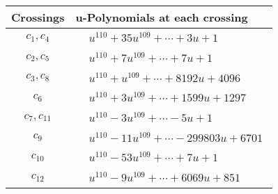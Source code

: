 \documentclass[1p]{elsarticle_modified}
\theoremstyle{definition}
\begin{document}
\begin{tabular}{m{50pt}|m{274pt}}
Crossings & \hspace{64pt}u-Polynomials at each crossing \\
\hline $$\begin{aligned}c_{1},c_{4}\end{aligned}$$&$\begin{aligned}
&u^{110}+35 u^{109}+\cdots+3 u+1
\end{aligned}$\\
\hline $$\begin{aligned}c_{2},c_{5}\end{aligned}$$&$\begin{aligned}
&u^{110}+7 u^{109}+\cdots+7 u+1
\end{aligned}$\\
\hline $$\begin{aligned}c_{3},c_{8}\end{aligned}$$&$\begin{aligned}
&u^{110}+u^{109}+\cdots+8192 u+4096
\end{aligned}$\\
\hline $$\begin{aligned}c_{6}\end{aligned}$$&$\begin{aligned}
&u^{110}+3 u^{109}+\cdots+1599 u+1297
\end{aligned}$\\
\hline $$\begin{aligned}c_{7},c_{11}\end{aligned}$$&$\begin{aligned}
&u^{110}-3 u^{109}+\cdots-5 u+1
\end{aligned}$\\
\hline $$\begin{aligned}c_{9}\end{aligned}$$&$\begin{aligned}
&u^{110}-11 u^{109}+\cdots-299803 u+6701
\end{aligned}$\\
\hline $$\begin{aligned}c_{10}\end{aligned}$$&$\begin{aligned}
&u^{110}-53 u^{109}+\cdots+7 u+1
\end{aligned}$\\
\hline $$\begin{aligned}c_{12}\end{aligned}$$&$\begin{aligned}
&u^{110}-9 u^{109}+\cdots+6069 u+851
\end{aligned}$\\
\hline
\end{tabular}\\~\\
\end{document}
